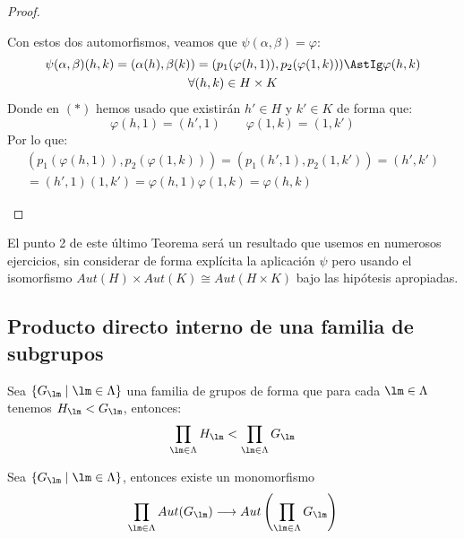 \begin{teo}
\begin{proof}
\begin{enumerate}
                Con estos dos automorfismos, veamos que $\psi(\alpha,\beta) = \varphi$:
                \begin{multline*}
                    \psi(\alpha,\beta)(h,k) = (\alpha(h), \beta(k)) = (p_1(\varphi(h,1)), p_2(\varphi(1,k))) \AstIg \varphi(h,k) \\ \forall (h,k)\in H\times K
                \end{multline*}
                Donde en $(\ast)$ hemos usado que existirán $h'\in H$ y $k'\in K$ de forma que:
                \begin{equation*}
                    \varphi(h,1) = (h', 1) \qquad \varphi(1,k) = (1,k')
                \end{equation*}
                Por lo que:
                \begin{multline*}
                     (p_1(\varphi(h,1)), p_2(\varphi(1,k))) = (p_1(h',1), p_2(1,k')) = (h',k') \\ = (h',1)(1,k') = \varphi(h,1)\varphi(1,k) = \varphi(h,k)
                \end{multline*}
        \end{enumerate}
    \end{proof}
\end{teo}

\noindent
El punto 2 de este último Teorema será un resultado que usemos en numerosos ejercicios, sin considerar de forma explícita la aplicación $\psi$ pero usando el isomorfismo $Aut(H)\times Aut(K) \cong Aut(H\times K)$ bajo las hipótesis apropiadas.

\subsection{Producto directo interno de una familia de subgrupos}
\begin{teo}
    Sea $\{G_\lm \mid \lm \in \Lambda\}$ una familia de grupos de forma que para cada $\lm\in \Lambda$ tenemos $H_\lm < G_\lm$, entonces:
    \begin{equation*}
        \prod_{\lm\in \Lambda} H_\lm < \prod_{\lm\in \Lambda} G_\lm
    \end{equation*}
\end{teo}

\begin{teo}
    Sea $\{G_\lm \mid \lm \in \Lambda\}$, entonces existe un monomorfismo
    \begin{equation*}
        \prod_{\lm\in \Lambda}Aut(G_\lm) \longrightarrow Aut\left(\prod_{\lm\in \Lambda} G_\lm\right)
    \end{equation*}
\end{teo}

